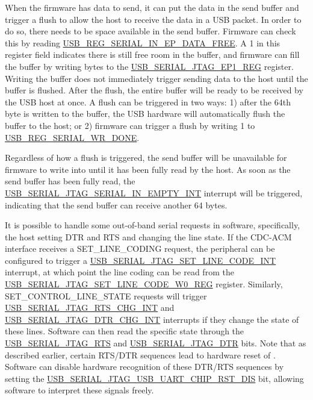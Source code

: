 \documentclass[main\_\_EN.tex]{subfiles}
\begin{document}
When the firmware has data to send, it can put the data in the send
buffer and trigger a flush to allow the host to receive the data in a USB packet. In order to do so, there needs to be space available in the send buffer. Firmware can check this by reading \hyperref[fielddesc:USBSERIALJTAGSERIALINEPDATAFREE]{USB\_REG\_SERIAL\_IN\_EP\_DATA\_FREE}. A 1 in this register field indicates there is still free room in the buffer, and firmware can fill the buffer by writing bytes to the \hyperref[fielddesc:USBSERIALJTAGRDWRBYTE]{USB\_SERIAL\_JTAG\_EP1\_REG} register. Writing the buffer does not immediately trigger sending data to the host until the buffer is flushed. After the flush, the entire buffer will be ready to be received by the USB host at once. A flush can be triggered in two ways: 1) after the 64th byte is written to the buffer, the USB hardware will automatically flush the buffer to the host; or 2) firmware can trigger a flush by writing 1 to \hyperref[fielddesc:USBSERIALJTAGWRDONE]{USB\_REG\_SERIAL\_WR\_DONE}.

Regardless of how a flush is triggered, the send buffer will be unavailable for firmware to write into until it has been fully read by the host. As soon as the send buffer has been fully read, the \hyperref[fielddesc:USBSERIALJTAGSERIALINEMPTYINTRAW]{USB\_SERIAL\_JTAG\_SERIAL\_IN\_EMPTY\_INT} interrupt will be triggered, indicating that the send buffer can receive another 64 bytes.

It is possible to handle some out-of-band serial requests in software, specifically, the host setting DTR and RTS and changing the line state. If the CDC-ACM interface receives a SET\_LINE\_CODING request, the peripheral can be configured to trigger a \hyperref[int:USBSERIALJTAGSETLINECODEINT]{USB\_SERIAL\_JTAG\_SET\_LINE\_CODE\_INT} interrupt, at which point the line coding can be read from the \hyperref[regdesc:USBSERIALJTAGSETLINECODEW0REG]{USB\_SERIAL\_JTAG\_SET\_LINE\_CODE\_W0\_REG} register. Similarly, SET\_CONTROL\_LINE\_STATE requests will trigger \hyperref[int:USBSERIALJTAGRTSCHGINT]{USB\_SERIAL\_JTAG\_RTS\_CHG\_INT} and \hyperref[int:USBSERIALJTAGDTRCHGINT]{USB\_SERIAL\_JTAG\_DTR\_CHG\_INT} interrupts if they change the state of these lines. Software can then read the specific state through the \hyperref[fielddesc:USBSERIALJTAGRTS]{USB\_SERIAL\_JTAG\_RTS} and \hyperref[fielddesc:USBSERIALJTAGDTR]{USB\_SERIAL\_JTAG\_DTR} bits. Note that as described earlier, certain RTS/DTR sequences lead to hardware reset of \chipname{}. Software can disable hardware recognition of these DTR/RTS sequences by setting the \hyperref[fielddesc:USBSERIALJTAGUSBUARTCHIPRSTDIS]{USB\_SERIAL\_JTAG\_USB\_UART\_CHIP\_RST\_DIS} bit, allowing software to interpret these signals freely.
\end{document}
